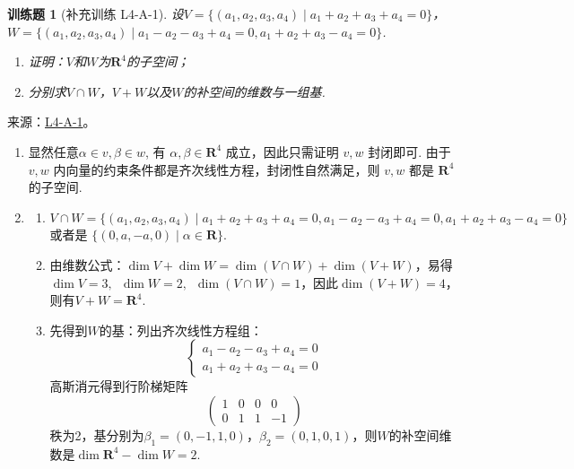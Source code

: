 \documentclass[UTF8,12pt,a4paper,fontset=fandol]{ctexart}
\newtheorem{exercise}{训练题}[section]
\begin{document}
\begin{exercise}[补充训练 L4-A-1]\label{prob:L4-A-1}
设$V=\{(a_1,a_2,a_3,a_4) \mid a_1+a_2+a_3+a_4=0\}$，$W=\{(a_1,a_2,a_3,a_4) \mid a_1-a_2-a_3+a_4=0,a_1+a_2+a_3-a_4=0\}$.
        \begin{enumerate}
            \item 证明：$V$和$W$为$\mathbf{R}^4$的子空间；
            \item 分别求$V \cap W$，$V+W$以及$W$的补空间的维数与一组基.
        \end{enumerate}
\end{exercise}
\noindent 来源：\href{https://github.com/yhwu-is/Linear-Algebra-Left-Undone/blob/new/%E8%AE%B2%E4%B9%89/%E4%B8%93%E9%A2%98/4%20%E7%BA%BF%E6%80%A7%E7%A9%BA%E9%97%B4%E7%9A%84%E8%BF%90%E7%AE%97.tex}{L4-A-1}。
\begin{solve}
\begin{enumerate}
                \item 显然任意$\alpha\in v,\beta \in w$, 有 $\alpha,\beta\in \mathbf{R}^4$ 成立，因此只需证明 $v,w$ 封闭即可. 由于 $v,w$ 内向量的约束条件都是齐次线性方程，封闭性自然满足，则 $v,w$ 都是 $\mathbf{R}^4$ 的子空间.

                \item \begin{enumerate}
                          \item $V\cap W=\{(a_1,a_2,a_3,a_4) \mid a_1+a_2+a_3+a_4=0,a_1-a_2-a_3+a_4=0,a_1+a_2+a_3-a_4=0\}$ 或者是 $\{(0,a,-a,0) \mid \alpha\in \mathbf{R}\}$.

                          \item 由维数公式：$\dim V+\dim W=\dim (V\cap W)+\dim (V+W)$，易得$\dim V=3,\enspace \dim W=2,\enspace \dim (V\cap W)=1$，因此$\dim (V+W)=4$，则有$V+W=\mathbf{R}^4$.

                          \item 先得到$W$的基：列出齐次线性方程组：
                                \[\begin{cases}
                                        a_1-a_2-a_3+a_4=0 \\
                                        a_1+a_2+a_3-a_4=0\end{cases}
                                \]
                                高斯消元得到行阶梯矩阵
                                \[\begin{pmatrix}
                                        1 & 0 & 0 & 0  \\
                                        0 & 1 & 1 & -1
                                    \end{pmatrix}\]
                                秩为2，基分别为$\beta_1= (0,-1,1,0)$，$\beta_2= (0,1,0,1)$，则$W$的补空间维数是$\dim \mathbf{R}^4 - \dim W=2$.


\end{enumerate}
\end{enumerate}
\end{solve}
\end{document}
